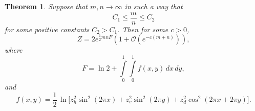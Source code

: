 \documentclass[12pt,reqno]{amsart}
\numberwithin{equation}{section}
\newtheorem{theo}{{\sc \bf Theorem}}[section]
\begin{document}
\begin{theo} Suppose that $ m,n \to \infty$ in such a way that
\begin{equation}\label{c12}
C_1\le \frac{m}{n}\le C_2
\end{equation}
for some positive constants $C_2>C_1$. Then for some $c>0$,
\begin{equation}\label{AsympF}
Z=2e^{\frac{1}{2}mnF}\left(1+\mathcal{O}\left(e^{-c(m+n)}\right)\right),
\end{equation}
where 
\begin{equation}\label{p16}
F=\ln 2+\int\limits_0^1\int\limits_0^1 f(x,y)\,dx\,dy,
\end{equation}
and
\begin{equation}\label{pcopy2}
f(x,y)=\frac{1}{2}\,\ln\big[z_h^2 \sin^2 (2\pi x)
+z_v^2 \sin^2 (2\pi y)
+z_d^2\cos^2 (2\pi x+2\pi y)\big].
\end{equation}
\end{theo}
\end{document}
